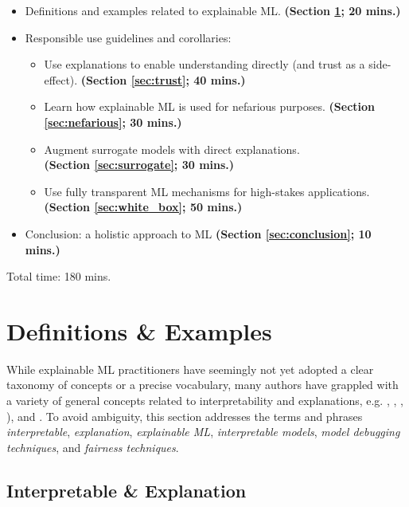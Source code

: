 \documentclass[sigconf]{acmart}
\begin{document}
\begin{itemize}
\item Definitions and examples related to explainable ML. \textbf{(Section \ref{sec:intro}; 20 mins.)}
\item Responsible use guidelines and corollaries:
\begin{itemize}
	\item Use explanations to enable understanding directly (and trust as a side-effect). \textbf{(Section \ref{sec:trust}; 40 mins.)}
	\item Learn how explainable ML is used for nefarious purposes. \textbf{(Section \ref{sec:nefarious}; 30 mins.)}
	\item Augment surrogate models with direct explanations.\\\textbf{(Section \ref{sec:surrogate}; 30 mins.)}
	\item Use fully transparent ML mechanisms for high-stakes applications. \textbf{(Section \ref{sec:white_box}; 50 mins.)}
\end{itemize}
\item Conclusion: a holistic approach to ML \textbf{(Section \ref{sec:conclusion}; 10 mins.)}
\end{itemize}
\noindent Total time: 180 mins.

\section{Definitions \& Examples} \label{sec:intro}

While explainable ML practitioners have seemingly not yet adopted a clear taxonomy of concepts or a precise vocabulary, many authors have grappled with a variety of general concepts related to interpretability and explanations, e.g. \citet{guidotti2018survey}, \citet{lipton1}, \citet{molnar}, \citet{murdoch2019interpretable}), and \citet{weller2017challenges}. To avoid ambiguity, this section addresses the terms and phrases \textit{interpretable}, \textit{explanation}, \textit{explainable ML}, \textit{interpretable models}, \textit{model debugging techniques}, and \textit{fairness techniques}.

\subsection{Interpretable \& Explanation}
\end{document}

